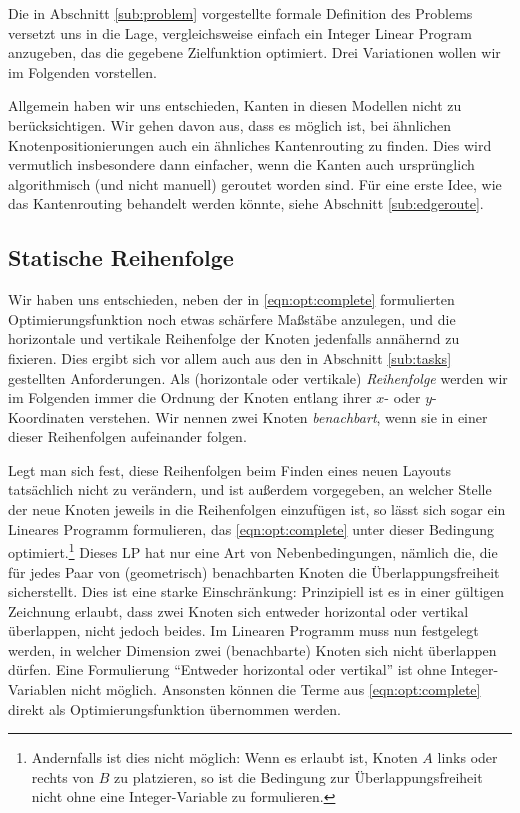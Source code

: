 Die in Abschnitt \ref{sub:problem} vorgestellte formale Definition des Problems versetzt uns in die Lage, vergleichsweise einfach ein Integer Linear Program anzugeben, das die gegebene Zielfunktion optimiert. Drei Variationen wollen wir im Folgenden vorstellen.

Allgemein haben wir uns entschieden, Kanten in diesen Modellen nicht zu berücksichtigen. Wir gehen davon aus, dass es möglich ist, bei ähnlichen Knotenpositionierungen auch ein ähnliches Kantenrouting zu finden. Dies wird vermutlich insbesondere dann einfacher, wenn die Kanten auch ursprünglich algorithmisch (und nicht manuell) geroutet worden sind. Für eine erste Idee, wie das Kantenrouting behandelt werden könnte, siehe Abschnitt \ref{sub:edgeroute}.

\subsection{Statische Reihenfolge}

Wir haben uns entschieden, neben der in \ref{eqn:opt:complete} formulierten Optimierungsfunktion noch etwas schärfere Maßstäbe anzulegen, und die horizontale und vertikale Reihenfolge der Knoten jedenfalls annähernd zu fixieren. Dies ergibt sich vor allem auch aus den in Abschnitt \ref{sub:tasks} gestellten Anforderungen. Als (horizontale oder vertikale) \textit{Reihenfolge} werden wir im Folgenden immer die Ordnung der Knoten entlang ihrer $x$- oder $y$-Koordinaten verstehen. Wir nennen zwei Knoten \textit{benachbart}, wenn sie in einer dieser Reihenfolgen aufeinander folgen.

Legt man sich fest, diese Reihenfolgen beim Finden eines neuen Layouts tatsächlich nicht zu verändern, und ist außerdem vorgegeben, an welcher Stelle der neue Knoten jeweils in die Reihenfolgen einzufügen ist, so lässt sich sogar ein Lineares Programm formulieren, das \ref{eqn:opt:complete} unter dieser Bedingung optimiert.\footnote{Andernfalls ist dies nicht möglich: Wenn es erlaubt ist, Knoten $A$ links oder rechts von $B$ zu platzieren, so ist die Bedingung zur Überlappungsfreiheit nicht ohne eine Integer-Variable zu formulieren.} Dieses LP hat nur eine Art von Nebenbedingungen, nämlich die, die für jedes Paar von (geometrisch) benachbarten Knoten die Überlappungsfreiheit sicherstellt. Dies ist eine starke Einschränkung: Prinzipiell ist es in einer gültigen Zeichnung erlaubt, dass zwei Knoten sich entweder horizontal oder vertikal überlappen, nicht jedoch beides. Im Linearen Programm muss nun festgelegt werden, in welcher Dimension zwei (benachbarte) Knoten sich nicht überlappen dürfen. Eine Formulierung "`Entweder horizontal oder vertikal"' ist ohne Integer-Variablen nicht möglich. Ansonsten können die Terme aus \ref{eqn:opt:complete} direkt als Optimierungsfunktion übernommen werden.

